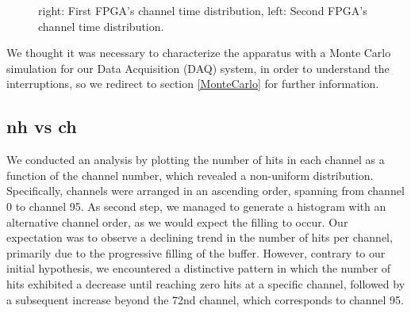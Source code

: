 \documentclass[12pt]{article}
\begin{document}
\begin{figure}[H]
  \hspace{-0.5in}
  \caption{
    \label{fig:1}
    right: First FPGA's channel time distribution, left: Second FPGA's channel time distribution.
  }
\end{figure}
We thought it was necessary to characterize the apparatus with a Monte Carlo simulation for our Data Acquisition (DAQ) system, in order to understand the interruptions,
so we redirect to section \ref{MonteCarlo} for further information.
\subsection{nh vs ch}
We conducted an analysis by plotting the number of hits in each channel as a function of the channel number, which revealed a non-uniform distribution. 
Specifically, channels were arranged in an ascending order, spanning from channel 0 to channel 95.
As second step, we managed to generate a histogram with an alternative channel order, as we would expect the filling to occur.
Our expectation was to observe a declining trend in the number of hits per channel, primarily due to the progressive filling of the buffer. 
However, contrary to our initial hypothesis, we encountered a distinctive pattern in which the number of hits exhibited a decrease until reaching zero hits at a specific channel,
followed by a subsequent increase beyond the 72nd channel, which corresponds to channel 95.
\end{document}
